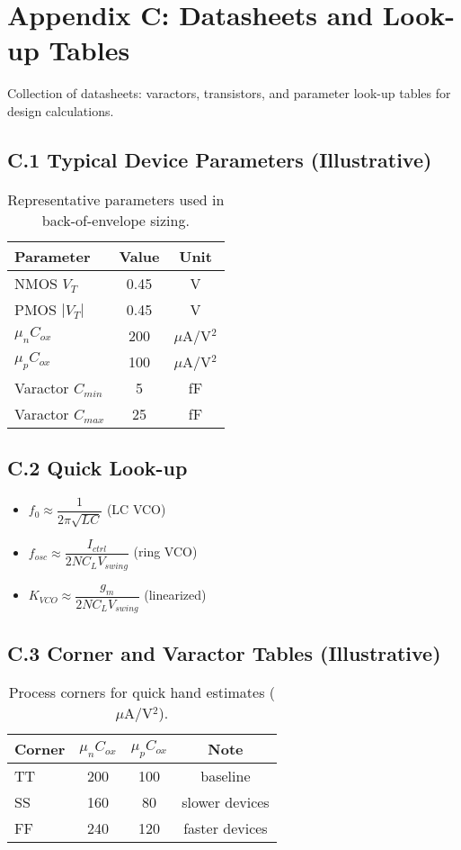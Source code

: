 \chapter{Appendix C: Datasheets and Look-up Tables}
Collection of datasheets: varactors, transistors, and parameter look-up tables for design calculations.

\section*{C.1 Typical Device Parameters (Illustrative)}
\begin{table}[H]
  \centering
  \begin{tabular}{lcc}
    \toprule
    Parameter & Value & Unit \\
    \midrule
    NMOS $V_T$ & 0.45 & V \\
    PMOS $|V_T|$ & 0.45 & V \\
    $\mu_n C_{ox}$ & 200 & $\mu$A/V$^2$ \\
    $\mu_p C_{ox}$ & 100 & $\mu$A/V$^2$ \\
    Varactor $C_{min}$ & 5 & fF \\
    Varactor $C_{max}$ & 25 & fF \\
    \bottomrule
  \end{tabular}
  \caption{Representative parameters used in back-of-envelope sizing.}
\end{table}

\section*{C.2 Quick Look-up}
\begin{itemize}
  \item $f_0 \approx \dfrac{1}{2\pi\sqrt{LC}}$ (LC VCO)
  \item $f_{osc} \approx \dfrac{I_{ctrl}}{2 N C_L V_{swing}}$ (ring VCO)
  \item $K_{VCO} \approx \dfrac{g_m}{2 N C_L V_{swing}}$ (linearized)
\end{itemize}

\section*{C.3 Corner and Varactor Tables (Illustrative)}
\begin{table}[H]
  \centering
  \begin{tabular}{lccc}
    \toprule
    Corner & $\mu_n C_{ox}$ & $\mu_p C_{ox}$ & Note \\
    \midrule
    TT & 200 & 100 & baseline \\
    SS & 160 & 80 & slower devices \\
    FF & 240 & 120 & faster devices \\
    \bottomrule
  \end{tabular}
  \caption{Process corners for quick hand estimates ($\mu$A/V$^2$).}
\end{table}

